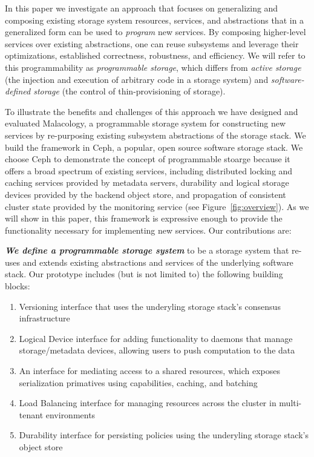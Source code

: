 \documentclass[preprint]{sigplanconf-eurosys}
\begin{document}
In this paper we investigate an approach that focuses on generalizing and
composing existing
storage system resources, services, and abstractions that in a generalized form
can be used to \emph{program} new services. By composing higher-level services
over existing abstractions, one can reuse
subsystems and leverage their optimizations, established correctness,
robustness, and efficiency. We will refer to this programmability as
\emph{programmable storage}, which differs from \emph{active storage} (the
injection and execution of arbitrary code in a storage system) and
\emph{software-defined storage} (the control of thin-provisioning of storage).

To illustrate the benefits and challenges of this approach we have designed and
evaluated Malacology, a programmable storage system for constructing new
services by re-purposing existing subsystem abstractions of the storage stack.
We build the framework in Ceph, a popular, open source software storage stack.
We choose Ceph to demonstrate the concept of programmable stoarge because it
offers a broad spectrum of existing services, including distributed locking and
caching services provided by metadata servers, durability and logical storage
devices provided by the backend object store, and propagation of consistent
cluster state provided by the monitoring service (see
Figure~\ref{fig:overview}). As we will show in this paper, this framework is
expressive enough to provide the functionality necessary for implementing new
services. Our contributions are:

{\it \textbf{We define a programmable storage system}} to be a storage system that re-uses and extends existing
abstractions and services of the underlying software stack. Our prototype
includes (but is not limited to) the following building blocks:

\begin{enumerate}

\item Versioning interface that uses the underyling storage stack's consensus
infrastructure 

\item Logical Device interface for adding functionality to daemons that manage
storage/metadata devices, allowing users to push computation to the data

\item An interface for mediating access to a shared resources, which exposes
serialization primatives using capabilities, caching, and batching

\item Load Balancing interface for managing resources across the cluster in
multi-tenant environments

\item Durability interface for persisting policies using the underyling storage
stack's object store

\end{enumerate}
\end{document}
